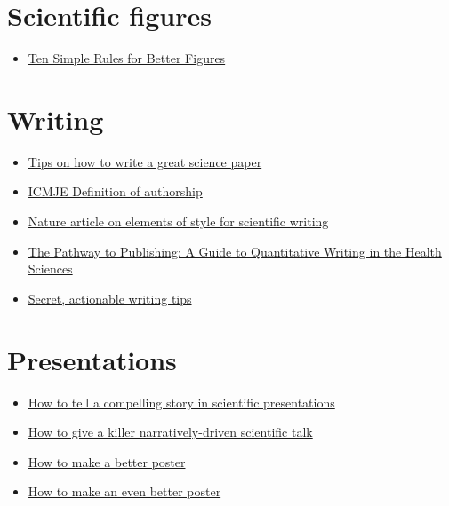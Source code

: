 \documentclass[
]{book}
\providecommand{\tightlist}{%
  \setlength{\itemsep}{0pt}\setlength{\parskip}{0pt}}
\begin{document}
\section{Scientific figures}\label{scientific-figures}

\begin{itemize}
\tightlist
\item
  \href{https://journals.plos.org/ploscompbiol/article?id=10.1371/journal.pcbi.1003833}{Ten Simple Rules for Better Figures}
\end{itemize}

\section{Writing}\label{writing}

\begin{itemize}
\tightlist
\item
  \href{https://www.nature.com/articles/d41586-019-02918-5}{Tips on how to write a great science paper}
\item
  \href{http://www.icmje.org/recommendations/browse/roles-and-responsibilities/defining-the-role-of-authors-and-contributors.html}{ICMJE Definition of authorship}
\item
  \href{https://www.nature.com/articles/nphys724}{Nature article on elements of style for scientific writing}
\item
  \href{https://link.springer.com/book/10.1007/978-3-030-98175-4}{The Pathway to Publishing: A Guide to Quantitative Writing in the Health Sciences}
\item
  \href{https://x.com/acagamic/status/1680381737816424450}{Secret, actionable writing tips}
\end{itemize}

\section{Presentations}\label{presentations}

\begin{itemize}
\tightlist
\item
  \href{https://www.nature.com/articles/d41586-021-03603-2}{How to tell a compelling story in scientific presentations}
\item
  \href{https://www-sciencedirect-com.stanford.idm.oclc.org/science/article/pii/S1471491423000928}{How to give a killer narratively-driven scientific talk}
\item
  \href{https://www.youtube.com/watch?v=1RwJbhkCA58&t=1171s}{How to make a better poster}
\item
  \href{https://mitcommlab.mit.edu/be/2023/09/27/toward-an-evenbetterposter-improving-the-betterposter-template/}{How to make an even better poster}
\end{itemize}
\end{document}
